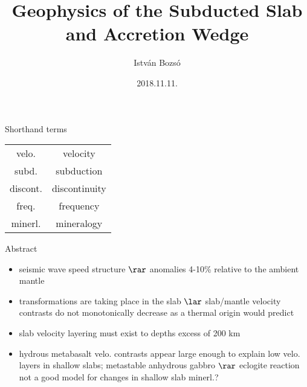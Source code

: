 \documentclass[aspectratio=169]{beamer}
\title[Geophysics of Subducted Slab]{Geophysics of the Subducted Slab and Accretion Wedge}
\author{István Bozsó}
\institute[MTA CSFK GGI]{MTA CSFK Geodetic and Geophysical Institute}
\date{2018.11.11.}
\begin{document}
\begin{frame}
    \titlepage
\end{frame}

\begin{frame}{Shorthand terms}
    \begin{table}
        \begin{tabular}{c|c}
            velo. & velocity \\
            subd. & subduction \\
            discont. & discontinuity \\
            freq. & frequency \\
            minerl. & mineralogy
        \end{tabular}
    \end{table}
\end{frame}

\begin{frame}{\SubdLithoVelo}
    \vspace{10pt}
    
    Abstract
    \begin{itemize}
        \item seismic wave speed structure $\rar$ anomalies 4-10\% relative to the ambient mantle
        \item transformations are taking place in the slab $\lar$ slab/mantle velocity contrasts do not monotonically decrease as a thermal origin would predict
        \item slab velocity layering must exist to depths excess of 200 km
        \item hydrous metabasalt velo. contrasts appear large enough to explain low velo. layers in shallow slabs; metastable anhydrous gabbro $\rar$ eclogite reaction not a good model for changes in shallow slab minerl.?
    \end{itemize}
\end{frame}
\end{document}
